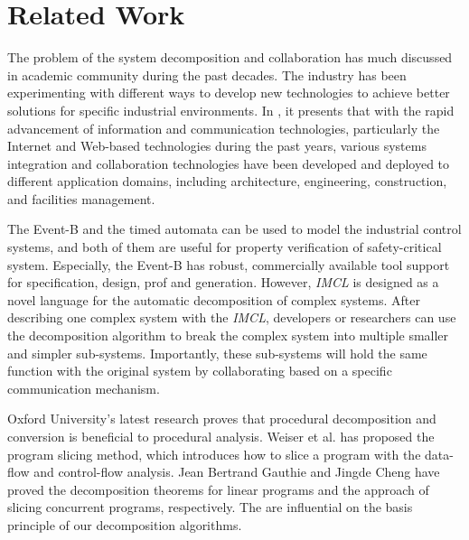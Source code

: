 ﻿\section{Related Work}

The problem of the system decomposition and collaboration has much discussed in academic community during the past decades. The industry has been experimenting with different ways to develop new technologies to achieve better solutions for specific industrial environments\cite{korhonen2001four}.
In \cite{Shen2010196}, it presents that with the rapid advancement of information and communication technologies, particularly the Internet and Web-based technologies during the past years, various systems integration and collaboration technologies have been developed and deployed to different application domains, including architecture, engineering, construction, and facilities management.

The Event-B\cite{Event-B} and the timed automata\cite{timeAutomata}\cite{TimedTools} can be used to model the industrial control systems, and both of them are useful for property verification of safety-critical system. Especially, the Event-B has robust, commercially available tool support for specification, design, prof and generation. However, \emph{IMCL} is designed as a novel language for the automatic decomposition of complex systems. After describing one complex system with the \emph{IMCL}, developers or researchers can use the decomposition algorithm to break the complex system into multiple smaller and simpler sub-systems. Importantly, these sub-systems will hold the same function with the original system by collaborating based on a specific communication mechanism.

Oxford University's latest research\cite{david2015using} proves that procedural decomposition and conversion is beneficial to procedural analysis.
Weiser et al.\cite{weiser1981program} has proposed the program slicing method, which introduces how to slice a program with the data-flow and control-flow analysis. Jean Bertrand Gauthie\cite{DBLP:journals/orl/GauthierDL14} and Jingde Cheng\cite{Cheng:1993:SCP:646902.710201} have proved the decomposition theorems for linear programs and the approach of slicing concurrent programs, respectively.
The \cite{weiser1981program,DBLP:journals/orl/GauthierDL14,Cheng:1993:SCP:646902.710201} are influential on the basis principle of our decomposition algorithms.

